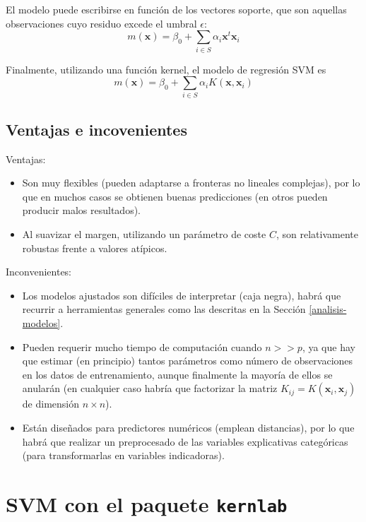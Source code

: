 \documentclass[
]{book}
\theoremstyle{break}
\theoremstyle{definition}
\theoremstyle{definition}
\theoremstyle{definition}
\theoremstyle{remark}
\begin{document}
El modelo puede escribirse en función de los vectores soporte, que son aquellas observaciones cuyo residuo excede el umbral \(\epsilon\):
\[m(\mathbf{x}) = \beta_0 + \sum_{i\in S} \alpha_i \mathbf{x}^t \mathbf{x}_i\]

Finalmente, utilizando una función kernel, el modelo de regresión SVM es
\[m(\mathbf{x}) = \beta_0 + \sum_{i\in S} \alpha_i K(\mathbf{x}, \mathbf{x}_i)\]

\hypertarget{ventajas-e-incovenientes}{%
\subsection{Ventajas e incovenientes}\label{ventajas-e-incovenientes}}

Ventajas:

\begin{itemize}
\item
  Son muy flexibles (pueden adaptarse a fronteras no lineales complejas), por lo que en muchos casos se obtienen buenas predicciones (en otros pueden producir malos resultados).
\item
  Al suavizar el margen, utilizando un parámetro de coste \(C\), son relativamente robustas frente a valores atípicos.
\end{itemize}

Inconvenientes:

\begin{itemize}
\item
  Los modelos ajustados son difíciles de interpretar (caja negra), habrá que recurrir a herramientas generales como las descritas en la Sección \ref{analisis-modelos}.
\item
  Pueden requerir mucho tiempo de computación cuando \(n >> p\), ya que hay que estimar (en principio) tantos parámetros como número de observaciones en los datos de entrenamiento, aunque finalmente la mayoría de ellos se anularán (en cualquier caso habría que factorizar la matriz \(K_{ij} = K(\mathbf{x}_i, \mathbf{x}_j)\) de dimensión \(n \times n\)).
\item
  Están diseñados para predictores numéricos (emplean distancias), por lo que habrá que realizar un preprocesado de las variables explicativas categóricas (para transformarlas en variables indicadoras).
\end{itemize}

\hypertarget{svm-con-el-paquete-kernlab}{%
\section{\texorpdfstring{SVM con el paquete \texttt{kernlab}}{SVM con el paquete kernlab}}\label{svm-con-el-paquete-kernlab}}
\end{document}
